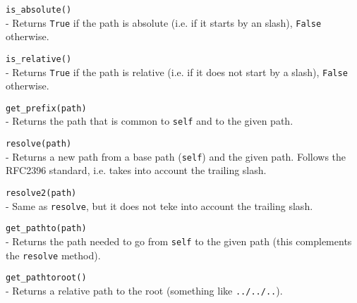 \begin{api}
  {\tt is\_absolute()}\\
  - Returns {\tt True} if the path is absolute (i.e. if it starts by an
  slash), {\tt False} otherwise.

  {\tt is\_relative()}\\
  - Returns {\tt True} if the path is relative (i.e. if it does not start
    by a slash), {\tt False} otherwise.

  {\tt get\_prefix(path)}\\
  - Returns the path that is common to {\tt self} and to the given path.

  {\tt resolve(path)}\\
  - Returns a new path from a base path ({\tt self}) and the given path.
  Follows the RFC2396 standard, i.e. takes into account the trailing slash.

  {\tt resolve2(path)}\\
  - Same as {\tt resolve}, but it does not teke into account the trailing
  slash.

  {\tt get\_pathto(path)}\\
  - Returns the path needed to go from {\tt self} to the given path (this
    complements the {\tt resolve} method).

  {\tt get\_pathtoroot()}\\
  - Returns a relative path to the root (something like {\tt ../../..}).
\end{api}

